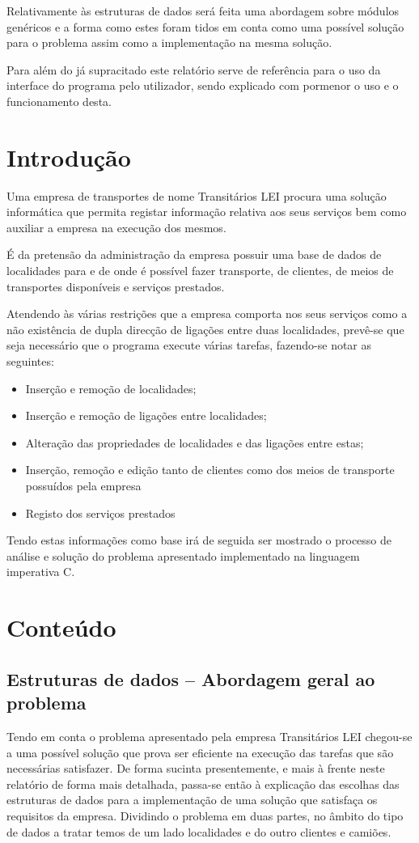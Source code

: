 \documentclass[a5paper,twocolumn, 11pt]{article}
\begin{document}
Relativamente às estruturas de dados será feita uma abordagem sobre módulos genéricos e a forma como estes foram tidos em conta como uma possível solução para o problema assim como a implementação na mesma solução.

Para além do já supracitado este relatório serve de referência para o uso da interface do programa pelo utilizador, sendo explicado com pormenor o uso e o funcionamento desta.

\clearpage
\section{Introdução}
Uma empresa de transportes de nome Transitários LEI procura uma solução informática que permita registar informação relativa aos seus serviços bem como auxiliar a empresa na execução dos mesmos.

É da pretensão da administração da empresa possuir uma base de dados de localidades para e de onde é possível fazer transporte, de clientes, de meios de transportes disponíveis e serviços prestados.

Atendendo às várias restrições que a empresa comporta nos seus serviços como a não existência de dupla direcção de ligações entre duas localidades, prevê-se que seja necessário que o programa execute várias tarefas, fazendo-se notar as seguintes:
\begin{itemize}
    \item{Inserção e remoção de localidades;}
    \item{Inserção e remoção de ligações entre localidades;}
    \item{Alteração das propriedades de localidades e das ligações entre estas;}
    \item{Inserção, remoção e edição tanto de clientes como dos meios de transporte possuídos pela empresa}
    \item{Registo dos serviços prestados}
\end{itemize}
Tendo estas informações como base irá de seguida ser mostrado o processo de análise e
solução do problema apresentado implementado na linguagem imperativa C.

\clearpage
\section{Conteúdo}
\subsection[Estruturas de dados]{Estruturas de dados -- Abordagem geral ao problema}
\label{abordagem geral}
Tendo em conta o problema apresentado pela empresa Transitários LEI chegou-se a uma possível solução que prova ser eficiente na execução das tarefas que são necessárias satisfazer. De forma sucinta presentemente, e mais à frente neste relatório de forma mais detalhada, passa-se então à explicação das escolhas das estruturas de dados para a implementação de uma solução que satisfaça os requisitos da empresa. Dividindo o problema em duas partes, no âmbito do tipo de dados a tratar temos de um lado localidades e do outro clientes e camiões.
\end{document}
